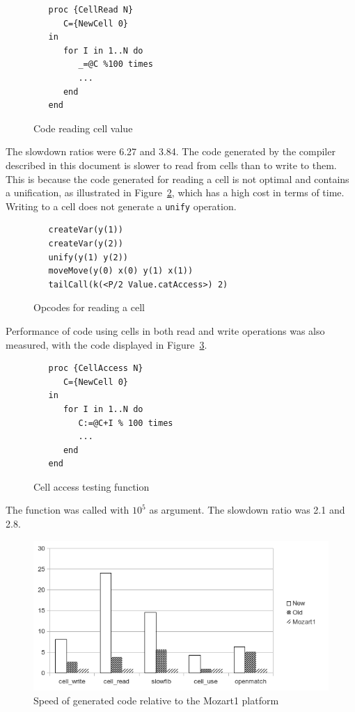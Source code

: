 \documentclass[a4paper]{memoir}
\begin{document}
\begin{figure}[h]
\begin{lstlisting}
   proc {CellRead N}
      C={NewCell 0}
   in
      for I in 1..N do
         _=@C %100 times
         ...
      end
   end
\end{lstlisting}
\caption{Code reading cell value}
\label{fig:perf:cellread}
\end{figure}

The slowdown ratios were 6.27 and 3.84.
The code generated by the compiler described in this document is slower to read from cells than to write to them.
This is because the code generated for reading a cell is not optimal and contains a unification,
as illustrated in Figure~\ref{fig:perf:cellreadunif}, which has a high cost in
terms of time. Writing to a cell does not generate a \lstinline!unify!
operation. 

\begin{figure}[h]
\begin{lstlisting}
   createVar(y(1))
   createVar(y(2))
   unify(y(1) y(2))
   moveMove(y(0) x(0) y(1) x(1))
   tailCall(k(<P/2 Value.catAccess>) 2)
\end{lstlisting}
\caption{Opcodes for reading a cell}
\label{fig:perf:cellreadunif}
\end{figure}



Performance of code using cells in both read and write operations was also measured, with the code displayed in
Figure~\ref{fig:perf:cells}.

\begin{figure}[h]
\begin{lstlisting}
   proc {CellAccess N}
      C={NewCell 0}
   in
      for I in 1..N do
         C:=@C+I % 100 times
         ...
      end
   end
\end{lstlisting}
\caption{Cell access testing function}
\label{fig:perf:cells}
\end{figure}


The function was called with $10^5$ as argument.
The slowdown ratio was 2.1 and 2.8.

\begin{figure}[ht]
\includegraphics[scale=0.8]{../perfs/chart.png}
\caption{Speed of generated code relative to the Mozart1 platform}
\label{fig:chart}
\end{figure}
\end{document}
